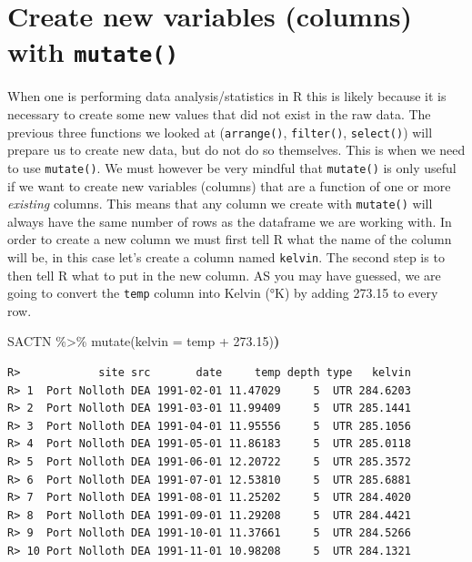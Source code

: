 \documentclass[
]{book}
\newenvironment{Shaded}{\begin{snugshade}}{\end{snugshade}}
\newcommand{\AttributeTok}[1]{\textcolor[rgb]{0.77,0.63,0.00}{#1}}
\newcommand{\ErrorTok}[1]{\textcolor[rgb]{0.64,0.00,0.00}{\textbf{#1}}}
\newcommand{\FloatTok}[1]{\textcolor[rgb]{0.00,0.00,0.81}{#1}}
\newcommand{\FunctionTok}[1]{\textcolor[rgb]{0.00,0.00,0.00}{#1}}
\newcommand{\NormalTok}[1]{#1}
\newcommand{\SpecialCharTok}[1]{\textcolor[rgb]{0.00,0.00,0.00}{#1}}
\begin{document}
\hypertarget{create-new-variables-columns-with-mutate}{%
\section{\texorpdfstring{Create new variables (columns) with \texttt{mutate()}}{Create new variables (columns) with mutate()}}\label{create-new-variables-columns-with-mutate}}

When one is performing data analysis/statistics in R this is likely because it is necessary to create some new values that did not exist in the raw data. The previous three functions we looked at (\texttt{arrange()}, \texttt{filter()}, \texttt{select()}) will prepare us to create new data, but do not do so themselves. This is when we need to use \texttt{mutate()}. We must however be very mindful that \texttt{mutate()} is only useful if we want to create new variables (columns) that are a function of one or more \emph{existing} columns. This means that any column we create with \texttt{mutate()} will always have the same number of rows as the dataframe we are working with. In order to create a new column we must first tell R what the name of the column will be, in this case let's create a column named \texttt{kelvin}. The second step is to then tell R what to put in the new column. AS you may have guessed, we are going to convert the \texttt{temp} column into Kelvin (°K) by adding 273.15 to every row.

\begin{Shaded}
\begin{Highlighting}[]
\NormalTok{SACTN }\SpecialCharTok{\%\textgreater{}\%} 
  \FunctionTok{mutate}\NormalTok{(}\AttributeTok{kelvin =}\NormalTok{ temp }\SpecialCharTok{+} \FloatTok{273.15}\NormalTok{)}\ErrorTok{)}
\end{Highlighting}
\end{Shaded}

\begin{verbatim}
R>            site src       date     temp depth type   kelvin
R> 1  Port Nolloth DEA 1991-02-01 11.47029     5  UTR 284.6203
R> 2  Port Nolloth DEA 1991-03-01 11.99409     5  UTR 285.1441
R> 3  Port Nolloth DEA 1991-04-01 11.95556     5  UTR 285.1056
R> 4  Port Nolloth DEA 1991-05-01 11.86183     5  UTR 285.0118
R> 5  Port Nolloth DEA 1991-06-01 12.20722     5  UTR 285.3572
R> 6  Port Nolloth DEA 1991-07-01 12.53810     5  UTR 285.6881
R> 7  Port Nolloth DEA 1991-08-01 11.25202     5  UTR 284.4020
R> 8  Port Nolloth DEA 1991-09-01 11.29208     5  UTR 284.4421
R> 9  Port Nolloth DEA 1991-10-01 11.37661     5  UTR 284.5266
R> 10 Port Nolloth DEA 1991-11-01 10.98208     5  UTR 284.1321
\end{verbatim}
\end{document}

